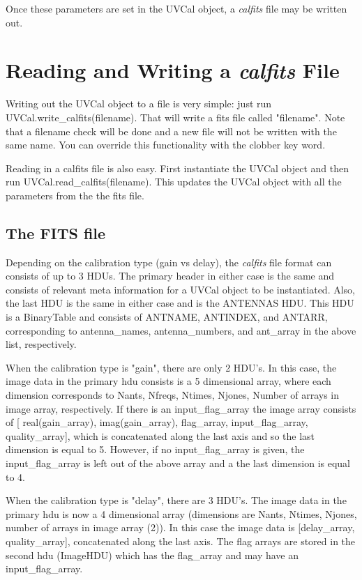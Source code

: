 \documentclass[11pt, oneside]{article}   	%
\begin{document}
Once these parameters are set in the UVCal object, a \textit{calfits} file may be written out. 

\section{Reading and Writing a \textit{calfits} File}
Writing out the UVCal object to a file is very simple: just run UVCal.write\_calfits(filename). That will write a fits file called "filename". Note that a filename check will be done and a new file will not be written with the same name. You can override this functionality with the  clobber key word. 

Reading in a calfits file is also easy. First instantiate the UVCal object and then run UVCal.read\_calfits(filename). This updates the UVCal object with all the parameters from the the fits file. 

\subsection{The FITS file}
Depending on the calibration type (gain vs delay), the \textit{calfits} file format can consists of up to 3 HDUs. The primary header in either case is the same and consists of relevant meta information for a UVCal object to be instantiated. Also, the last HDU is the same in either case and is the ANTENNAS HDU. This HDU is a BinaryTable and consists of ANTNAME, ANTINDEX, and ANTARR, corresponding to antenna\_names, antenna\_numbers, and ant\_array in the above list, respectively. 

When the calibration type is "gain", there are only 2 HDU's. In this case, the image data in the primary hdu consists is a 5 dimensional array, where each dimension corresponds to Nants, Nfreqs, Ntimes, Njones, Number of arrays in image array, respectively. If there is an input\_flag\_array the image array consists of [ real(gain\_array), imag(gain\_array), flag\_array, input\_flag\_array, quality\_array], which is concatenated along the last axis and so the last dimension is equal to 5. However, if no input\_flag\_array is given, the input\_flag\_array is left out of the above array and a the last dimension is equal to 4.

When the calibration type is "delay", there are 3 HDU's. The image data in the primary hdu is now a 4 dimensional array (dimensions are Nants, Ntimes, Njones, number of arrays in image array (2)). In this case the image data is [delay\_array, quality\_array], concatenated along the last axis. The flag arrays are stored in the second hdu (ImageHDU) which has the flag\_array and may have an input\_flag\_array.  
\end{document}
